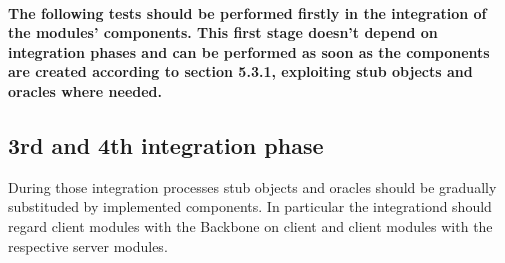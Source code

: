 \paragraph{The following tests should be performed firstly in the integration of the modules' components. This first stage doesn't depend on integration phases and can be performed as soon as the components are created according to section 5.3.1, exploiting stub objects and oracles where needed.}
\subsection{3rd and 4th integration phase}
During those integration processes stub objects and oracles should be gradually substituded by implemented components. In particular the integrationd should regard client modules with the Backbone on client and client modules with the respective server modules.


